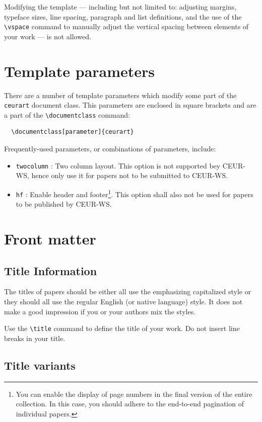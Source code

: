 \documentclass[
]{ceurart}
\begin{document}
Modifying the template --- including but not limited to: adjusting
margins, typeface sizes, line spacing, paragraph and list definitions,
and the use of the \verb|\vspace| command to manually adjust the
vertical spacing between elements of your work --- is not allowed.

\section{Template parameters}

There are a number of template
parameters which modify some part of the \verb|ceurart| document class.
This parameters are enclosed in square
brackets and are a part of the \verb|\documentclass| command:
\begin{lstlisting}
  \documentclass[parameter]{ceurart}
\end{lstlisting}

Frequently-used parameters, or combinations of parameters, include:
\begin{itemize}
\item \verb|twocolumn| : Two column layout. This option is not supported bey CEUR-WS, hence only use it for papers not to be submitted to CEUR-WS.
\item \verb|hf| : Enable header and footer\footnote{You can enable
    the display of page numbers in the final version of the entire
    collection. In this case, you should adhere to the end-to-end
    pagination of individual papers.}.  This option shall also not be used for papers to be published by CEUR-WS.
\end{itemize}

\section{Front matter}

\subsection{Title Information}

The titles of papers should be either all use the emphasizing
capitalized style or they should all use the regular English (or
native language) style. It does not make a good impression if you or
your authors mix the styles.

Use the \verb|\title| command to define the title of your work. Do not
insert line breaks in your title.

\subsection{Title variants}
\end{document}
